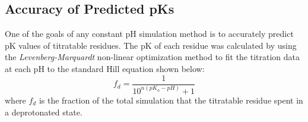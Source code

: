 \subsection{Accuracy of Predicted pKs}

One of the goals of any constant pH simulation method is to accurately predict
pK values of titratable residues. The pK of each residue was
calculated by using the \emph{Levenberg-Marquardt} non-linear optimization
method to fit the titration data at each pH to the standard Hill equation shown
below:
\begin{equation}
 f_{d} = \frac 1 {10 ^ {n \left( pK_a - pH \right)} + 1}
 \label{eq3:hill}
\end{equation}
where $f_d$ is the fraction of the total simulation that the titratable residue
spent in a deprotonated state.

